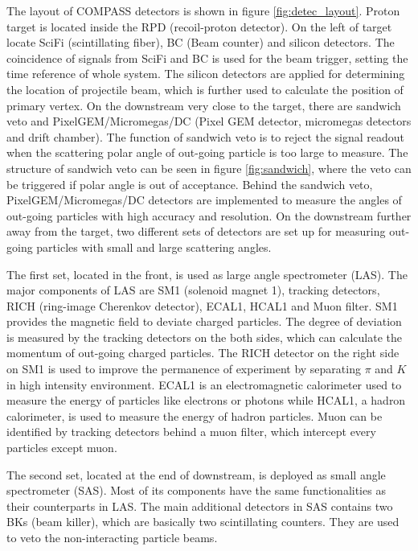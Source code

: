 The layout of COMPASS detectors is shown in figure \ref{fig:detec_layout}. Proton target is located inside the RPD (recoil-proton detector). On the left of target locate SciFi (scintillating fiber), BC (Beam counter) and silicon detectors. The coincidence of signals from SciFi and BC is used for the beam trigger, setting the time reference of whole system. The silicon detectors are applied for determining the location of projectile beam, which is further used to calculate the position of primary vertex. On the downstream very close to the target, there are sandwich veto and PixelGEM/Micromegas/DC (Pixel GEM detector, micromegas detectors and drift chamber). The function of sandwich veto is to reject the signal readout when the scattering polar angle of out-going particle is too large to measure. The structure of sandwich veto can be seen in figure \ref{fig:sandwich}, where the veto can be triggered if polar angle is out of acceptance. Behind the sandwich veto, PixelGEM/Micromegas/DC detectors are implemented to measure the angles of out-going particles with high accuracy and resolution. On the downstream further away from the target, two different sets of detectors are set up for measuring out-going particles with small and large scattering angles. 

The first set, located in the front, is used as large angle spectrometer (LAS). The major components of LAS are SM1 (solenoid magnet 1), tracking detectors, RICH (ring-image Cherenkov detector), ECAL1, HCAL1 and Muon filter. SM1 provides the magnetic field to deviate charged particles. The degree of deviation is measured by the tracking detectors on the both sides, which can calculate the momentum of out-going charged particles. The RICH detector on the right side on SM1 is used to improve the permanence of experiment by separating $\pi$ and $K$ in high intensity environment\cite{RICH}. ECAL1 is an electromagnetic calorimeter used to measure the energy of particles like electrons or photons while HCAL1, a hadron calorimeter, is used to measure the energy of hadron particles. Muon can be identified by tracking detectors behind a muon filter, which intercept every particles except muon.

The second set, located at the end of downstream, is deployed as small angle spectrometer (SAS). Most of its components have the same functionalities as their counterparts in LAS. The main additional detectors in SAS contains two BKs (beam killer), which are basically two scintillating counters. They are used to veto the non-interacting particle beams\cite{sandwich}.




